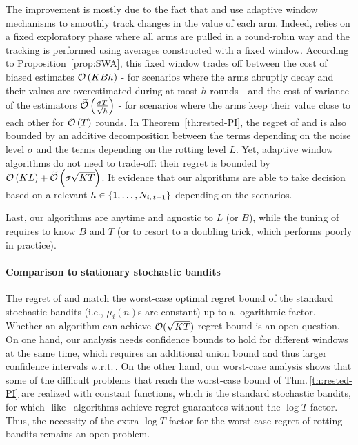 The improvement is mostly due to the fact that \FEWA and \RUCB use adaptive window mechanisms to smoothly track changes in the value of each arm.  Indeed, \SWA relies on a fixed exploratory phase where all arms are pulled in a round-robin way and the tracking is performed using averages constructed with a fixed window. According to Proposition~\ref{prop:SWA}, this fixed window trades off between the cost of biased estimates $\mathcal{O}\left(KBh\right)$ - for scenarios where the arms abruptly decay and their values are overestimated during at most $h$ rounds - and the cost of variance of the estimators $\widetilde{\mathcal{O}}\left({\frac{\sigma T}{\sqrt{h}}}\right)$ - for scenarios where the arms keep their value close to each other for $\mathcal{O}\left(T\right)$ rounds. In Theorem~\ref{th:rested-PI}, the regret of \FEWA and \RUCB is also bounded by an additive decomposition between the terms depending on the noise level $\sigma$ and the terms depending on the rotting level $L$. Yet, adaptive window algorithms do not need to trade-off: their regret is bounded by $\mathcal{O}\left(KL\right) +\widetilde{\mathcal{O}}\left(\sigma\sqrt{KT}\right)$. It evidence that our algorithms are able to take decision based on a relevant $h \in \left\{1, \dots, N_{i,\,t-1}\right\}$ depending on the scenarios.

Last, our algorithms are anytime and agnostic to $L$ (or $B$), while the tuning of \SWA requires to know $B$ and $T$ (or to resort to a doubling trick, which performs poorly in practice). 

\paragraph{Comparison to stationary stochastic bandits}
The regret of \FEWA and \RUCB match the worst-case optimal regret bound of the standard stochastic bandits (i.e., $\mu_i(n)$s are constant) up to a logarithmic factor. Whether an algorithm can achieve $\mathcal{O}(\sqrt{KT})$ regret bound is an open question. On one hand, our analysis needs confidence bounds to hold for different windows at the same time, which requires an additional union bound and thus larger confidence intervals w.r.t.\,\UCBone. On the other hand, our worst-case analysis shows that some of the difficult problems that reach the worst-case bound of Thm.\,\ref{th:rested-PI} are realized with constant 
functions, which is the standard stochastic bandits, for which \MOSS-like~\citep{audibert2009minimax} algorithms achieve regret guarantees without the $\log T$ factor. Thus, the necessity of the extra $\log T$ factor for the worst-case regret of rotting bandits remains an open problem.

